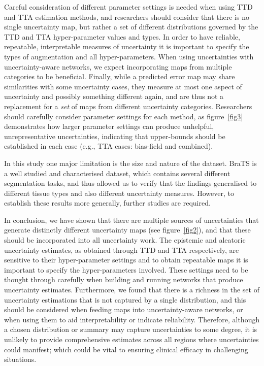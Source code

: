 \documentclass[runningheads]{llncs}
\begin{document}
Careful consideration of different parameter settings is needed when using TTD and TTA estimation methods, and researchers should consider that there is no single uncertainty map, but rather a set of different distributions governed by the TTD and TTA hyper-parameter values and types. In order to have reliable, repeatable, interpretable measures of uncertainty it is important to specify the types of augmentation and all hyper-parameters. When using uncertainties with uncertainty-aware networks, we expect incorporating maps from multiple categories to be beneficial. Finally, while a predicted error map may share similarities with some uncertainty cases, they measure at most one aspect of uncertainty and possibly something different again, and are thus not a replacement for a \textit{set} of maps from different uncertainty categories. Researchers should carefully consider parameter settings for each method, as figure~\ref{fig3} demonstrates how larger parameter settings can produce unhelpful, unrepresentative uncertainties, indicating that upper-bounds should be established in each case (e.g., TTA cases: bias-field and combined).

In this study one major limitation is the size and nature of the dataset. BraTS is a well studied and characterised dataset, which contains several different segmentation tasks, and thus allowed us to verify that the findings generalised to different tissue types and also different uncertainty measures. However, to establish these results more generally, further studies are required.

In conclusion, we have shown that there are multiple sources of uncertainties that generate distinctly different uncertainty maps (see figure~\ref{fig2}), and that these should be incorporated into all uncertainty work. The epistemic and aleatoric uncertainty estimates, as obtained through TTD and TTA respectively, are sensitive to their hyper-parameter settings and to obtain repeatable maps it is important to specify the hyper-parameters involved. These settings need to be thought through carefully when building and running networks that produce uncertainty estimates. Furthermore, we found that there is a richness in the set of uncertainty estimations that is not captured by a single distribution, and this should be considered when feeding maps into uncertainty-aware networks, or when using them to aid interpretability or indicate reliability. Therefore, although a chosen distribution or summary may capture uncertainties to some degree, it is unlikely to provide comprehensive estimates across all regions where uncertainties could manifest; which could be vital to ensuring clinical efficacy in challenging situations.
\end{document}
